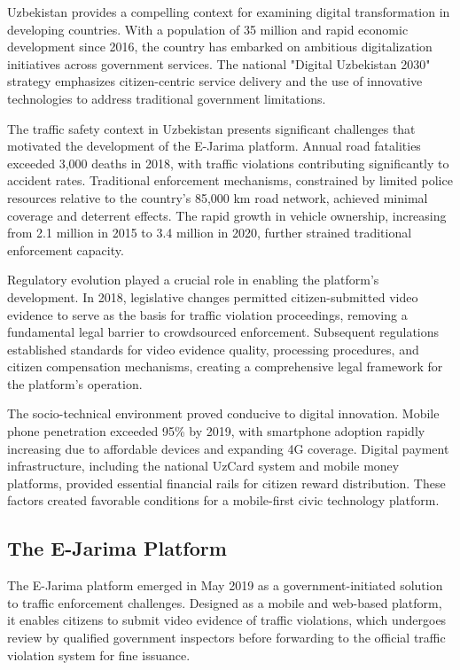 \documentclass[pdflatex,sn-mathphys-num]{sn-jnl}%
\theoremstyle{thmstyleone}%
\theoremstyle{thmstyletwo}%
\theoremstyle{thmstylethree}%
\begin{document}
Uzbekistan provides a compelling context for examining digital transformation in developing countries. With a population of 35 million and rapid economic development since 2016, the country has embarked on ambitious digitalization initiatives across government services. The national "Digital Uzbekistan 2030" strategy emphasizes citizen-centric service delivery and the use of innovative technologies to address traditional government limitations.

The traffic safety context in Uzbekistan presents significant challenges that motivated the development of the E-Jarima platform. Annual road fatalities exceeded 3,000 deaths in 2018, with traffic violations contributing significantly to accident rates. Traditional enforcement mechanisms, constrained by limited police resources relative to the country's 85,000 km road network, achieved minimal coverage and deterrent effects. The rapid growth in vehicle ownership, increasing from 2.1 million in 2015 to 3.4 million in 2020, further strained traditional enforcement capacity.

Regulatory evolution played a crucial role in enabling the platform's development. In 2018, legislative changes permitted citizen-submitted video evidence to serve as the basis for traffic violation proceedings, removing a fundamental legal barrier to crowdsourced enforcement. Subsequent regulations established standards for video evidence quality, processing procedures, and citizen compensation mechanisms, creating a comprehensive legal framework for the platform's operation.

The socio-technical environment proved conducive to digital innovation. Mobile phone penetration exceeded 95\% by 2019, with smartphone adoption rapidly increasing due to affordable devices and expanding 4G coverage. Digital payment infrastructure, including the national UzCard system and mobile money platforms, provided essential financial rails for citizen reward distribution. These factors created favorable conditions for a mobile-first civic technology platform.

\subsection{The E-Jarima Platform}\label{subsec9}

The E-Jarima platform emerged in May 2019 as a government-initiated solution to traffic enforcement challenges. Designed as a mobile and web-based platform, it enables citizens to submit video evidence of traffic violations, which undergoes review by qualified government inspectors before forwarding to the official traffic violation system for fine issuance.
\end{document}
